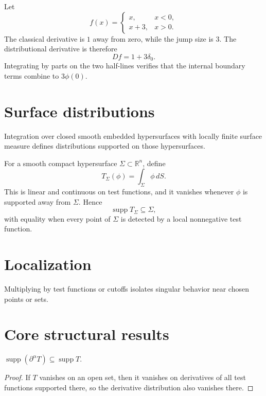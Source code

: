 \begin{example}\label{ex:iii17-expand-02}
Let
\[
f(x)=
\begin{cases}
x,&x<0,\\
x+3,&x>0.
\end{cases}
\]
The classical derivative is \(1\) away from zero, while the jump size is
\(3\). The distributional derivative is therefore
\[
Df=1+3\delta_0.
\]
Integrating by parts on the two half-lines verifies that the internal boundary
terms combine to \(3\phi(0)\).
\end{example}
\section{Surface distributions}
Integration over closed smooth embedded hypersurfaces with locally finite surface measure defines distributions supported on those hypersurfaces.


\begin{example}\label{ex:iii17-expand-03}
For a smooth compact hypersurface \(\Sigma\subset\mathbb R^n\), define
\[
T_\Sigma(\phi)=\int_\Sigma \phi\,dS.
\]
This is linear and continuous on test functions, and it vanishes whenever
\(\phi\) is supported away from \(\Sigma\). Hence
\[
\operatorname{supp}T_\Sigma\subseteq\Sigma,
\]
with equality when every point of \(\Sigma\) is detected by a local nonnegative
test function.
\end{example}
\section{Localization}
Multiplying by test functions or cutoffs isolates singular behavior near chosen points or sets.

\section{Core structural results}

\begin{theorem}\label{thm:iii17-01}
$\operatorname{supp}(\partial^\alpha T)\subseteq\operatorname{supp}T$.
\begin{proof}
If $T$ vanishes on an open set, then it vanishes on derivatives of all test functions supported there, so the derivative distribution also vanishes there.
\end{proof}
\end{theorem}

